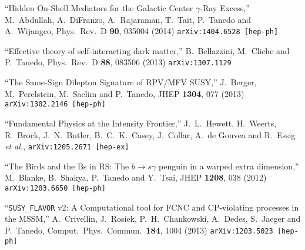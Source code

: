 \documentclass[margin,line]{resume}
\begin{document}
\begin{resume}
``Hidden On-Shell Mediators for the Galactic Center $\gamma$-Ray Excess,''
  M.~Abdullah, A.~DiFranzo, A.~Rajaraman, T.~Tait, P.~Tanedo and A.~Wijangco,
  Phys.\ Rev.\ D {\bf 90}, 035004 (2014)
  \texttt{arXiv:1404.6528 [hep-ph]}

\vspace{-2mm}
 
``Effective theory of self-interacting dark matter,''
  B.~Bellazzini, M.~Cliche and P.~Tanedo,
  Phys.\ Rev.\ D {\bf 88}, 083506 (2013)
\texttt{arXiv:1307.1129} 

\vspace{-2mm}
 
``The Same-Sign Dilepton Signature of RPV/MFV SUSY,''
  J.~Berger, M.~Perelstein, M.~Saelim and P.~Tanedo,
  JHEP {\bf 1304}, 077 (2013)
\texttt{arXiv:1302.2146 [hep-ph]} 

\vspace{-2mm}
 
``Fundamental Physics at the Intensity Frontier,''
  J.~L.~Hewett, H.~Weerts, R.~Brock, J.~N.~Butler, B.~C.~K.~Casey, J.~Collar, A.~de Gouvea and R.~Essig {\it et al.},
\texttt{arXiv:1205.2671 [hep-ex]} 

\vspace{-2mm}
 
``The Birds and the Bs in RS: The $b \to s \gamma$ penguin in a warped extra dimension,''
  M.~Blanke, B.~Shakya, P.~Tanedo and Y.~Tsai,
  JHEP {\bf 1208}, 038 (2012)
\texttt{arXiv:1203.6650 [hep-ph]} 

\vspace{-2mm}
 
``\texttt{SUSY\_FLAVOR} v2: A Computational tool for FCNC and CP-violating processes in the MSSM,''
  A.~Crivellin, J.~Rosiek, P.~H.~Chankowski, A.~Dedes, S.~Jaeger and P.~Tanedo,
  Comput.\ Phys.\ Commun.\  {\bf 184}, 1004 (2013)
\texttt{arXiv:1203.5023 [hep-ph]} 


\end{resume}
\end{document}
